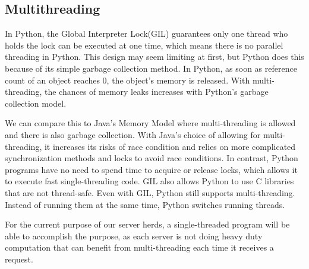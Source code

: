 \subsection{Multithreading}
In Python, the Global Interpreter Lock(GIL) guarantees only one thread who holds the lock can be executed at one time, which means there is no parallel threading in Python. This design may seem limiting at first, but Python does this because of its simple garbage collection method. In Python, as soon as reference count of an object reaches 0, the object's memory is released. With multi-threading, the chances of memory leaks increases with Python's garbage collection model. \par
We can compare this to Java's Memory Model where multi-threading is allowed and there is also garbage collection. With Java's choice of allowing for multi-threading, it increases its risks of race condition and relies on more complicated synchronization methods and locks to avoid race conditions. In contrast, Python programs have no need to spend time to acquire or release locks, which allows it to execute fast single-threading code. GIL also allows Python to use C libraries that are not thread-safe. Even with GIL, Python still supports multi-threading. Instead of running them at the same time, Python switches running threads. \par
For the current purpose of our server herds, a single-threaded program will be able to accomplish the purpose, as each server is not doing heavy duty computation that can benefit from multi-threading each time it receives a request. 
